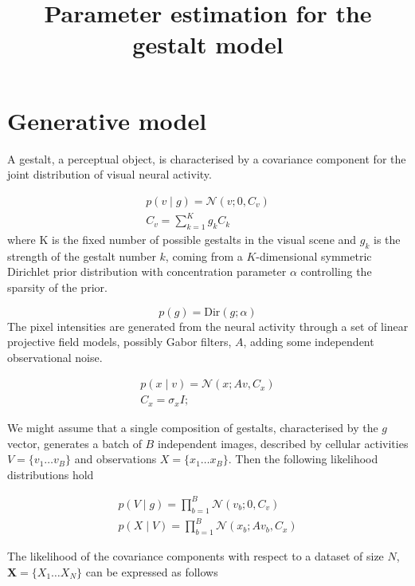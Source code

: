 \documentclass{paper}
\begin{document}
\title{Parameter estimation for the gestalt model}
\maketitle

\section{Generative model}

A gestalt, a perceptual object, is characterised by a covariance component for the joint distribution of visual neural activity. 

\begin{eqnarray}
p(v \mid g) = \mathcal{N}(v; 0,C_v) \\
C_v = \sum_{k=1}^K g_k C_k \label{eq:cv}
\end{eqnarray}
%
where K is the fixed number of possible gestalts in the visual scene and $g_k$ is the strength of the gestalt number $k$, coming from a $K$-dimensional symmetric Dirichlet prior distribution with concentration parameter $\alpha$ controlling the sparsity of the prior.

\begin{equation}
p(g) = \textrm{Dir}(g; \alpha)
\end{equation}
%
The pixel intensities are generated from the neural activity through a set of linear projective field models, possibly Gabor filters, $A$, adding some independent observational noise.

\begin{eqnarray}
p(x \mid v) = \mathcal{N}(x; Av,C_x) \\
C_x = \sigma_x I;
\end{eqnarray}

We might assume that a single composition of gestalts, characterised by the $g$ vector, generates a batch of $B$ independent images, described by cellular activities $V = \lbrace v_1 \dots v_B \rbrace$ and observations $X = \lbrace x_1 \dots x_B \rbrace$. Then the following likelihood distributions hold

\begin{eqnarray}
p(V \mid g) = \prod_{b=1}^B \mathcal{N}(v_b; 0,C_v) \\
p(X \mid V) = \prod_{b=1}^B \mathcal{N}(x_b; Av_b,C_x)
\end{eqnarray}

The likelihood of the covariance components with respect to a dataset of size $N$, $\mathbf{X} = \lbrace X_1 \dots X_N \rbrace$ can be expressed as follows
\end{document}
